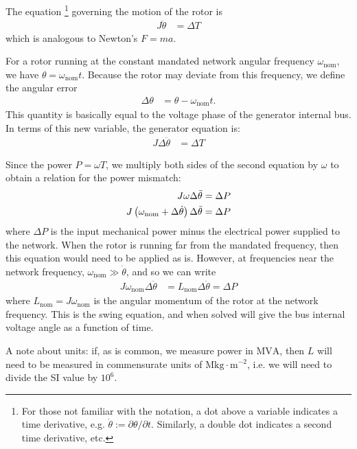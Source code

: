 \documentclass[11pt]{article}
\begin{document}
The equation \footnote{For those not familiar with the notation, a dot above a variable indicates a time derivative, e.g. $\dot{\theta} := \partial \theta / \partial t$. Similarly, a double dot indicates a second time derivative, etc.} governing the motion of the rotor is
\begin{align}
	J \ddot{\theta} &= \Delta T
\end{align}
which is analogous to Newton's $F = ma$.

For a rotor running at the constant mandated network angular frequency $\omega_\text{nom}$, we have $\theta = \omega_\text{nom} t$. Because the rotor may deviate from this frequency, we define the angular error
\begin{align}
	\Delta \theta &= \theta - \omega_\text{nom} t. \label{EQ_DEFN_DELTA_THETA}
\end{align}
This quantity is basically equal to the voltage phase of the generator internal bus. In terms of this new variable, the generator equation is:
\begin{align}
	J \Delta \ddot{\theta} &= \Delta T
\end{align}

Since the power $P = \omega T$, we multiply both sides of the second equation by $\omega$ to obtain a relation for the power mismatch:
\begin{align}
	J\omega \Delta \ddot{\theta} &= \Delta P \notag \\
	J\left(\omega_\text{nom} + \Delta \dot{\theta}\right) \Delta\ddot{\theta} &= \Delta P
\end{align}
where $\Delta P$ is the input mechanical power minus the electrical power supplied to the network. When the rotor is running far from the mandated frequency, then this equation would need to be applied as is. However, at frequencies near the network frequency, $\omega_\text{nom} \gg \dot{\theta}$, and so we can write
\begin{align}
	J\omega_\text{nom} \Delta\ddot{\theta} &= L_\text{nom} \Delta\ddot{\theta} = \Delta P \label{EQ_SWING}
\end{align}
where $L_\text{nom} = J \omega_\text{nom}$ is the angular momentum of the rotor at the network frequency. This is the swing equation, and when solved will give the bus internal voltage angle as a function of time.

A note about units: if, as is common, we measure power in $\mathrm{MVA}$, then $L$ will need to be measured in commensurate units of $\mathrm{Mkg\cdot m^{-2}}$, i.e. we will need to divide the SI value by $10^6$.
\end{document}

